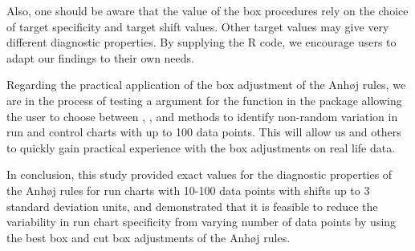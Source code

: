 Also, one should be aware that the value of the box procedures rely on
the choice of target specificity and target shift values. Other target
values may give very different diagnostic properties. By supplying the R
code, we encourage users to adapt our findings to their own needs.

Regarding the practical application of the box adjustment of the Anhøj
rules, we are in the process of testing a  argument for the
 function in the  package allowing the
user to choose between , , and
 methods to identify non-random variation in run and
control charts with up to 100 data points. This will allow us and others
to quickly gain practical experience with the box adjustments on real
life data.

In conclusion, this study provided exact values for the diagnostic
properties of the Anhøj rules for run charts with 10-100 data points
with shifts up to 3 standard deviation units, and demonstrated that it
is feasible to reduce the variability in run chart specificity from
varying number of data points by using the best box and cut box
adjustments of the Anhøj rules.



